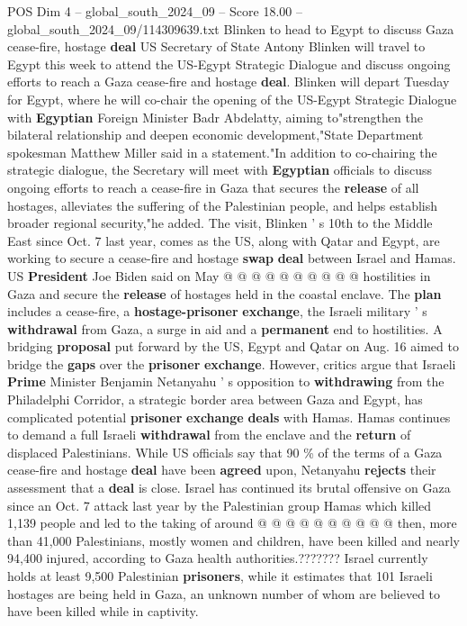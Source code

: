 \begin{textsample}{POS Dim 4 – global\_south\_2024\_09 – Score 18.00 – global\_south\_2024\_09/114309639.txt}  \label{ex:f4_pos_277}
Blinken to head to Egypt to discuss Gaza cease-fire, hostage \textbf{deal} US Secretary of State Antony Blinken will travel to Egypt this week to attend the US-Egypt Strategic Dialogue and discuss ongoing efforts to reach a Gaza cease-fire and hostage \textbf{deal}.
Blinken will depart Tuesday for Egypt, where he will co-chair the opening of the US-Egypt Strategic Dialogue with \textbf{Egyptian} Foreign Minister Badr Abdelatty, aiming to"strengthen the bilateral relationship and deepen economic development,"State Department spokesman Matthew Miller said in a statement."In addition to co-chairing the strategic dialogue, the Secretary will meet with \textbf{Egyptian} officials to discuss ongoing efforts to reach a cease-fire in Gaza that secures the \textbf{release} of all hostages, alleviates the suffering of the Palestinian people, and helps establish broader regional security,"he added.
The visit, Blinken ' s 10th to the Middle East since Oct. 7 last year, comes as the US, along with Qatar and Egypt, are working to secure a cease-fire and hostage \textbf{swap} \textbf{deal} between Israel and Hamas.
US \textbf{President} Joe Biden said on May @ @ @ @ @ @ @ @ @ @ hostilities in Gaza and secure the \textbf{release} of hostages held in the coastal enclave.
The \textbf{plan} includes a cease-fire, a \textbf{hostage-prisoner} \textbf{exchange}, the Israeli military ' s \textbf{withdrawal} from Gaza, a surge in aid and a \textbf{permanent} end to hostilities.
A bridging \textbf{proposal} put forward by the US, Egypt and Qatar on Aug. 16 aimed to bridge the \textbf{gaps} over the \textbf{prisoner} \textbf{exchange}.
However, critics argue that Israeli \textbf{Prime} Minister Benjamin Netanyahu ' s opposition to \textbf{withdrawing} from the Philadelphi Corridor, a strategic border area between Gaza and Egypt, has complicated potential \textbf{prisoner} \textbf{exchange} \textbf{deals} with Hamas.
Hamas continues to demand a full Israeli \textbf{withdrawal} from the enclave and the \textbf{return} of displaced Palestinians.
While US officials say that 90 \% of the terms of a Gaza cease-fire and hostage \textbf{deal} have been \textbf{agreed} upon, Netanyahu \textbf{rejects} their assessment that a \textbf{deal} is close.
Israel has continued its brutal offensive on Gaza since an Oct. 7 attack last year by the Palestinian group Hamas which killed 1,139 people and led to the taking of around @ @ @ @ @ @ @ @ @ @ then, more than 41,000 Palestinians, mostly women and children, have been killed and nearly 94,400 injured, according to Gaza health authorities.???????
Israel currently holds at least 9,500 Palestinian \textbf{prisoners}, while it estimates that 101 Israeli hostages are being held in Gaza, an unknown number of whom are believed to have been killed while in captivity.

\end{textsample}
